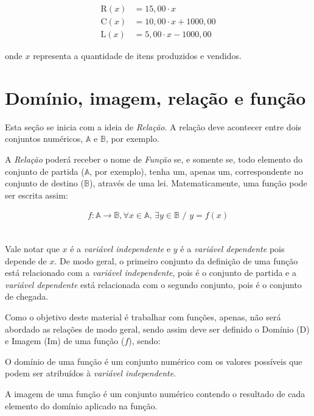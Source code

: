 \begin{ceqn}
	\begin{align*}
	\mathrm{R}(x) &= 15,00 \cdot x \\
	\mathrm{C}(x) &= 10,00 \cdot x +1000,00 \\
	\mathrm{L}(x) &= 5,00 \cdot x -1000,00
	\end{align*}
\end{ceqn}
\vspace{.5cm}
onde $x$ representa a quantidade de itens produzidos e vendidos.

\section{Domínio, imagem, relação e função}

Esta seção se inicia com a ideia de \textit{Relação}. A relação deve acontecer entre dois conjuntos numéricos, $\mathbb{A}$ e $\mathbb{B}$, por exemplo.

A \textit{Relação} poderá receber o nome de \textit{Função} se, e somente se, todo elemento do conjunto de partida ($\mathbb{A}$, por exemplo), tenha um, apenas um, correspondente no conjunto de destino ($\mathbb{B}$), através de uma lei. Matematicamente, uma função pode ser escrita assim:

\begin{ceqn}
	\begin{align*}
	f: \mathbb{A} \rightarrow \mathbb{B}, \forall x \in \mathbb{A}, \, \exists y \in \mathbb{B} \,\, / \,\, y=f(x)
	\end{align*}
\end{ceqn}
\\
Vale notar que $x$ é a \textit{variável independente} e $y$ é a \textit{variável dependente} pois depende de $x$. De modo geral, o primeiro conjunto da definição de uma função está relacionado com a \textit{variável independente}, pois é o conjunto de partida e a \textit{variável dependente} está relacionada com o segundo conjunto, pois é o conjunto de chegada.

Como o objetivo deste material é trabalhar com funções, apenas, não será abordado as relações de modo geral, sendo assim deve ser definido o Domínio ($\mathrm{D}$) e Imagem ($\mathrm{Im}$) de uma função ($f$), sendo:

\begin{definition}
	O domínio de uma função é um conjunto numérico com os valores possíveis que podem ser atribuídos à \textit{variável independente}.
\end{definition}
\vspace{.5cm}
\begin{definition}
	A imagem de uma função é um conjunto numérico contendo o resultado de cada elemento do domínio aplicado na função.
\end{definition}
\vspace{.5cm}

